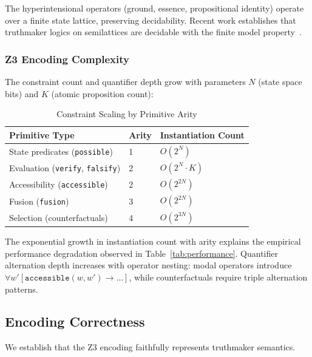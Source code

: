 \documentclass[pdflatex,sn-mathphys-num]{sn-jnl}
\newcommand{\imp}{\to}                      %
\newcommand{\zverify}{\texttt{verify}}
\newcommand{\zfalsify}{\texttt{falsify}}
\newcommand{\zaccessible}{\texttt{accessible}}
\newcommand{\zpossible}{\texttt{possible}}
\newcommand{\zfusion}{\texttt{fusion}}
\theoremstyle{thmstyleone}
\theoremstyle{thmstyletwo}
\theoremstyle{thmstylethree}
\begin{document}
The hyperintensional operators (ground, essence, propositional identity) operate over a finite state lattice, preserving decidability.
Recent work establishes that truthmaker logics on semilattices are decidable with the finite model property~\cite{knudstorp2023}.

\subsubsection{Z3 Encoding Complexity}

The constraint count and quantifier depth grow with parameters $N$ (state space bits) and $K$ (atomic proposition count):

\begin{table}[htbp]
\centering
\caption{Constraint Scaling by Primitive Arity}
\label{tab:constraint-scaling}
\begin{tabular}{@{}lll@{}}
\toprule
\textbf{Primitive Type} & \textbf{Arity} & \textbf{Instantiation Count} \\
\midrule
State predicates (\zpossible{}) & 1 & $O(2^N)$ \\
Evaluation (\zverify{}, \zfalsify{}) & 2 & $O(2^N \cdot K)$ \\
Accessibility (\zaccessible{}) & 2 & $O(2^{2N})$ \\
Fusion (\zfusion{}) & 3 & $O(2^{2N})$ \\
Selection (counterfactuals) & 4 & $O(2^{3N})$ \\
\bottomrule
\end{tabular}
\end{table}

The exponential growth in instantiation count with arity explains the empirical performance degradation observed in Table~\ref{tab:performance}.
Quantifier alternation depth increases with operator nesting: modal operators introduce $\forall w'[\zaccessible(w, w') \imp \ldots]$, while counterfactuals require triple alternation patterns.

\subsection{Encoding Correctness}\label{sec:encoding-correctness}

We establish that the Z3 encoding faithfully represents truthmaker semantics.
\end{document}

